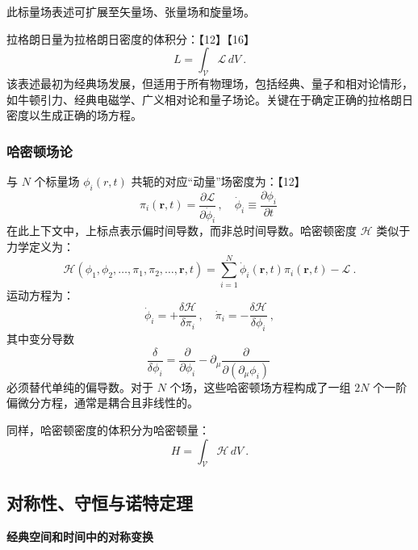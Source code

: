 此标量场表述可扩展至矢量场、张量场和旋量场。

拉格朗日量为拉格朗日密度的体积分：【12】【16】
\[
L = \int_{\mathcal{V}} \mathcal{L} \, dV ~.
\]
该表述最初为经典场发展，但适用于所有物理场，包括经典、量子和相对论情形，如牛顿引力、经典电磁学、广义相对论和量子场论。关键在于确定正确的拉格朗日密度以生成正确的场方程。
\subsubsection{哈密顿场论}  
与 \( N \) 个标量场 \( \phi_i(r, t) \) 共轭的对应“动量”场密度为：【12】
\[
\pi_i(\mathbf{r}, t) = \frac{\partial \mathcal{L}}{\partial \dot{\phi}_i} \,, \quad \dot{\phi}_i \equiv \frac{\partial \phi_i}{\partial t}~
\]
在此上下文中，上标点表示偏时间导数，而非总时间导数。哈密顿密度 \( \mathcal{H} \) 类似于力学定义为：
\[
\mathcal{H}(\phi_1, \phi_2, \dots, \pi_1, \pi_2, \dots, \mathbf{r}, t) = \sum_{i=1}^N \dot{\phi}_i(\mathbf{r}, t) \pi_i(\mathbf{r}, t) - \mathcal{L} ~.
\]
运动方程为：
\[
\dot{\phi}_i = +\frac{\delta \mathcal{H}}{\delta \pi_i} \,, \quad \dot{\pi}_i = -\frac{\delta \mathcal{H}}{\delta \phi_i} ~,
\]
其中变分导数
\[
\frac{\delta}{\delta \phi_i} = \frac{\partial}{\partial \phi_i} - \partial_\mu \frac{\partial}{\partial (\partial_\mu \phi_i)}~
\]
必须替代单纯的偏导数。对于 \( N \) 个场，这些哈密顿场方程构成了一组 \( 2N \) 个一阶偏微分方程，通常是耦合且非线性的。

同样，哈密顿密度的体积分为哈密顿量：
\[
H = \int_{\mathcal{V}} \mathcal{H} \, dV ~.
\]
\subsection{对称性、守恒与诺特定理}  
\textbf{经典空间和时间中的对称变换}  

